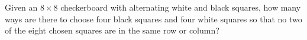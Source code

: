 Given an $8\times 8$ checkerboard with alternating white and black squares, how many ways are there to choose four black squares and four white squares so that no two of the eight chosen squares are in the same row or column?

